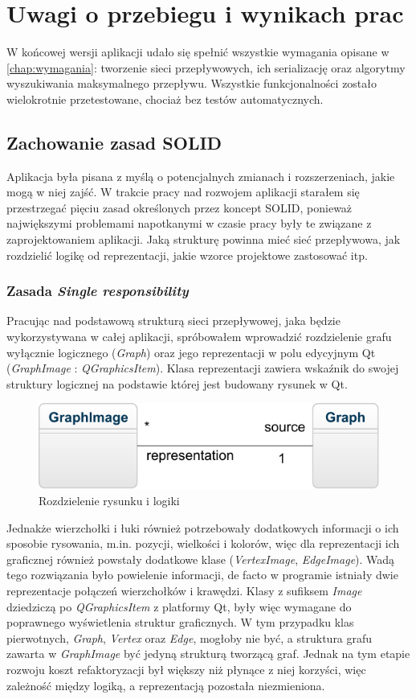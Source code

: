 \chapter{Uwagi o przebiegu i wynikach prac}
W końcowej wersji aplikacji udało się spełnić wszystkie wymagania opisane w \ref{chap:wymagania}: tworzenie sieci przepływowych, ich serializację oraz algorytmy wyszukiwania maksymalnego przepływu. Wszystkie funkcjonalności zostało wielokrotnie przetestowane, chociaż bez testów automatycznych.
\section{Zachowanie zasad SOLID}
Aplikacja była pisana z myślą o potencjalnych zmianach i rozszerzeniach, jakie mogą w niej zajść. W trakcie pracy nad rozwojem aplikacji starałem się przestrzegać pięciu zasad określonych przez koncept SOLID, ponieważ największymi problemami napotkanymi w czasie pracy były te związane z zaprojektowaniem aplikacji. Jaką strukturę powinna mieć sieć przepływowa, jak rozdzielić logikę od reprezentacji, jakie wzorce projektowe zastosować itp.
\subsection{Zasada \textit{Single responsibility}}
Pracując nad podstawową strukturą sieci przepływowej, jaka będzie wykorzystywana w całej aplikacji, spróbowałem wprowadzić rozdzielenie grafu wyłącznie logicznego (\emph{Graph}) oraz jego reprezentacji w polu edycyjnym Qt (\emph{GraphImage} : \emph{QGraphicsItem}). Klasa reprezentacji zawiera wskaźnik do swojej struktury logicznej na podstawie której jest budowany rysunek w Qt.
\begin{figure}[H]
	\centering
	\includegraphics[width=0.4\linewidth]{./img/SOLID_SR.pdf}
	\caption{Rozdzielenie rysunku i logiki}
	\label{fig:SOLD_SR}
\end{figure}
Jednakże wierzchołki i łuki również potrzebowały dodatkowych informacji o ich sposobie rysowania, m.in. pozycji, wielkości i kolorów, więc dla reprezentacji ich graficznej również powstały dodatkowe klase (\emph{VertexImage}, \emph{EdgeImage}). Wadą tego rozwiązania było powielenie informacji, de facto w programie istniały dwie reprezentacje połączeń wierzchołków i krawędzi. Klasy z sufiksem \emph{Image} dziedziczą po \emph{QGraphicsItem} z platformy Qt, były więc wymagane do poprawnego wyświetlenia struktur graficznych. W tym przypadku klas pierwotnych, \emph{Graph}, \emph{Vertex} oraz \emph{Edge}, mogłoby nie być, a struktura grafu zawarta w \emph{GraphImage} być jedyną strukturą tworzącą graf. Jednak na tym etapie rozwoju koszt refaktoryzacji był większy niż płynące z niej korzyści, więc zależność między logiką, a reprezentacją pozostała niezmieniona.
